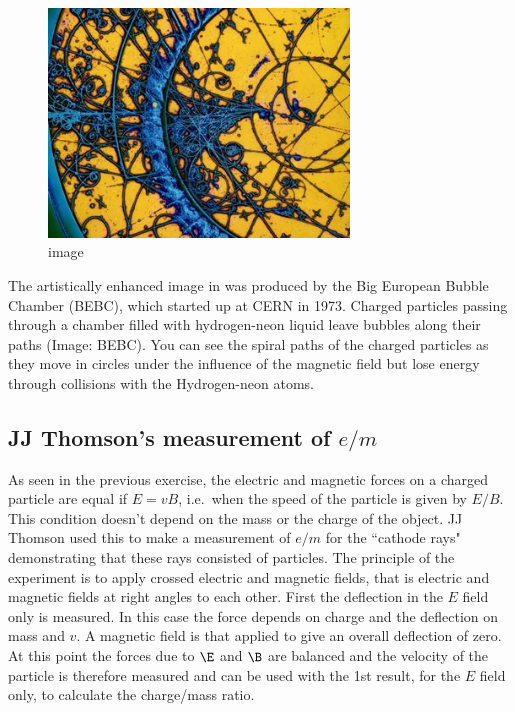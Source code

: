 \documentclass[
]{book}
\begin{document}
\begin{figure}
\centering
\includegraphics[width=80mm,height=\textheight]{Figures/bubble_chamber.jpg}
\caption{image}
\end{figure}

The artistically enhanced image in was produced by the Big European
Bubble Chamber (BEBC), which started up at CERN in 1973. Charged
particles passing through a chamber filled with hydrogen-neon liquid
leave bubbles along their paths (Image: BEBC). You can see the spiral
paths of the charged particles as they move in circles under the
influence of the magnetic field but lose energy through collisions with
the Hydrogen-neon atoms.

\hypertarget{jj-thomsons-measurement-of-em}{%
\subsection{\texorpdfstring{JJ Thomson's measurement of \(e/m\)}{JJ Thomson's measurement of e/m}}\label{jj-thomsons-measurement-of-em}}

As seen in the previous exercise, the electric and magnetic forces on a
charged particle are equal if \(E = vB\), i.e.~when the speed of the
particle is given by \(E/B\). This condition doesn't depend on the mass or
the charge of the object. JJ Thomson used this to make a measurement of
\(e/m\) for the ``cathode rays" demonstrating that these rays consisted of
particles. The principle of the experiment is to apply crossed electric
and magnetic fields, that is electric and magnetic fields at right
angles to each other. First the deflection in the \(E\) field only is
measured. In this case the force depends on charge and the deflection on
mass and \(v\). A magnetic field is that applied to give an overall
deflection of zero. At this point the forces due to \(\E\) and \(\B\) are
balanced and the velocity of the particle is therefore measured and can
be used with the 1st result, for the \(E\) field only, to calculate the
charge/mass ratio.
\end{document}
